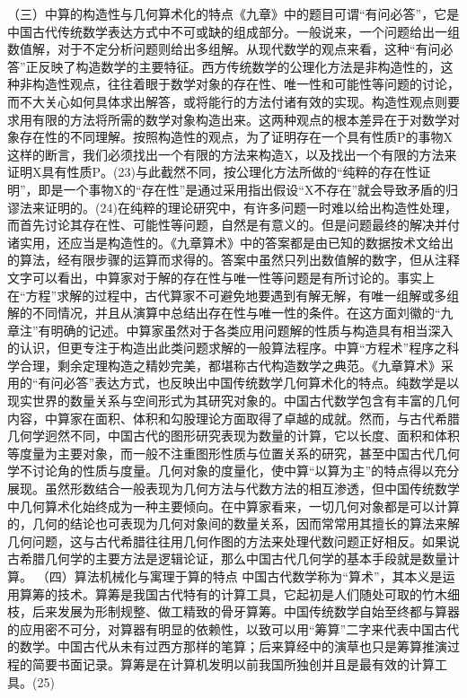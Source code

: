 \documentclass[a4paper,12pt,UTF8,twoside]{ctexbook}
\begin{document}
（三）中算的构造性与几何算术化的特点《九章》中的题目可谓“有问必答”，它是中国古代传统数学表达方式中不可或缺的组成部分。一般说来，一个问题给出一组数值解，对于不定分析问题则给出多组解。从现代数学的观点来看，这种“有问必答”正反映了构造数学的主要特征。西方传统数学的公理化方法是非构造性的，这种非构造性观点，往往着眼于数学对象的存在性、唯一性和可能性等问题的讨论，而不大关心如何具体求出解答，或将能行的方法付诸有效的实现。构造性观点则要求用有限的方法将所需的数学对象构造出来。这两种观点的根本差异在于对数学对象存在性的不同理解。按照构造性的观点，为了证明存在一个具有性质P的事物X这样的断言，我们必须找出一个有限的方法来构造X，以及找出一个有限的方法来证明X具有性质P。(23)与此截然不同，按公理化方法所做的“纯粹的存在性证明”，即是一个事物X的“存在性”是通过采用指出假设“X不存在”就会导致矛盾的归谬法来证明的。(24)在纯粹的理论研究中，有许多问题一时难以给出构造性处理，而首先讨论其存在性、可能性等问题，自然是有意义的。但是问题最终的解决并付诸实用，还应当是构造性的。《九章算术》中的答案都是由已知的数据按术文给出的算法，经有限步骤的运算而求得的。答案中虽然只列出数值解的数字，但从注释文字可以看出，中算家对于解的存在性与唯一性等问题是有所讨论的。事实上在“方程”求解的过程中，古代算家不可避免地要遇到有解无解，有唯一组解或多组解的不同情况，并且从演算中总结出存在性与唯一性的条件。在这方面刘徽的“九章注”有明确的记述。中算家虽然对于各类应用问题解的性质与构造具有相当深入的认识，但更专注于构造出此类问题求解的一般算法程序。中算“方程术”程序之科学合理，剩余定理构造之精妙完美，都堪称古代构造数学之典范。《九章算术》采用的“有问必答”表达方式，也反映出中国传统数学几何算术化的特点。纯数学是以现实世界的数量关系与空间形式为其研究对象的。中国古代数学包含有丰富的几何内容，中算家在面积、体积和勾股理论方面取得了卓越的成就。然而，与古代希腊几何学迥然不同，中国古代的图形研究表现为数量的计算，它以长度、面积和体积等度量为主要对象，而一般不注重图形性质与位置关系的研究，甚至中国古代几何学不讨论角的性质与度量。几何对象的度量化，使中算“以算为主”的特点得以充分展现。虽然形数结合一般表现为几何方法与代数方法的相互渗透，但中国传统数学中几何算术化始终成为一种主要倾向。在中算家看来，一切几何对象都是可以计算的，几何的结论也可表现为几何对象间的数量关系，因而常常用其擅长的算法来解几何问题，这与古代希腊往往用几何作图的方法来处理代数问题正好相反。如果说古希腊几何学的主要方法是逻辑论证，那么中国古代几何学的基本手段就是数量计算。
（四）算法机械化与寓理于算的特点
中国古代数学称为“算术”，其本义是运用算筹的技术。算筹是我国古代特有的计算工具，它起初是人们随处可取的竹木细枝，后来发展为形制规整、做工精致的骨牙算筹。中国传统数学自始至终都与算器的应用密不可分，对算器有明显的依赖性，以致可以用“筹算”二字来代表中国古代的数学。中国古代从未有过西方那样的笔算；后来算经中的演草也只是筹算推演过程的简要书面记录。算筹是在计算机发明以前我国所独创并且是最有效的计算工具。(25)
\end{document}
